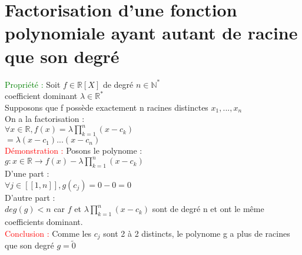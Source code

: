 \documentclass{article}
\begin{document}
	\section{Factorisation d'une fonction polynomiale ayant autant de racine que son degré}
	\textcolor{green}{Propriété :} Soit $f \in \mathbb{R}[X]$ de degré $ n \in \mathbb{N}^*$ \\
	coefficient dominant $ \lambda \in \mathbb{R}^*$ \\
	Supposons que f possède exactement n racines distinctes $ x_1,...,x_n$ \\
	On a la factorisation : \\
	$\forall x \in \mathbb{R},f(x)= \lambda \prod_{k=1}^n (x-c_k)$ \\
	\indent $= \lambda (x-c_1)...(x-c_n)$ \\
	\textcolor{red}{Démonstration :} Posons le polynome : \\
	\indent $g : x \in \mathbb{R} \rightarrow f(x) - \lambda \prod_{k=1}^n (x-c_k)$ \\
	D'une part : \\
	$\forall j \in [[1,n]], g(c_j)=0-0=0$ \\
	D'autre part : \\
	\indent $deg(g)<n$ car $f$ et $\lambda \prod_{k=1}^n (x-c_k)$ sont de degré n et ont le même coefficients dominant. \\
	\textcolor{red}{Conclusion :} Comme les $c_j$ sont 2 à 2 distincts, le polynome g a plus de racines que son degré $g= \tilde{0}$
\end{document}
